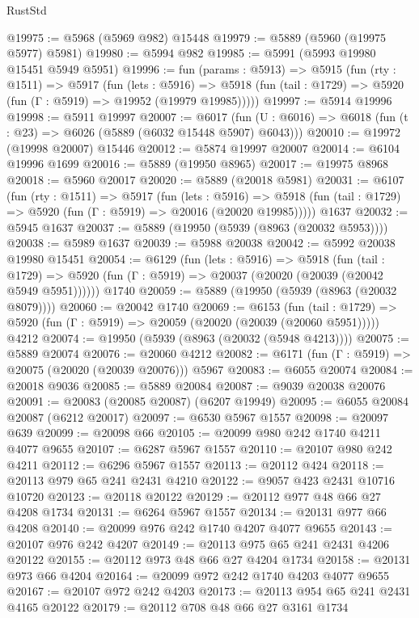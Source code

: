 \begin{lexlean}{RustStd}
\begin{coremodule}
@19975 := @5968 (@5969 @982) @15448
@19979 := @5889 (@5960 (@19975 @5977) @5981)
@19980 := @5994 @982
@19985 := @5991 (@5993 @19980 @15451 @5949 @5951)
@19996 := fun (params : @5913) =>
  @5915
    (fun (rty : @1511) =>
    @5917
      (fun (lets : @5916) =>
      @5918 (fun (tail : @1729) => @5920 (fun (Γ : @5919) => @19952 (@19979 @19985)))))
@19997 := @5914 @19996
@19998 := @5911 @19997
@20007 := @6017
    (fun (U : @6016) => @6018 (fun (t : @23) => @6026 (@5889 (@6032 @15448 @5907) @6043)))
@20010 := @19972 (@19998 @20007) @15446
@20012 := @5874 @19997 @20007
@20014 := @6104 @19996 @1699
@20016 := @5889 (@19950 @8965)
@20017 := @19975 @8968
@20018 := @5960 @20017
@20020 := @5889 (@20018 @5981)
@20031 := @6107
    (fun (rty : @1511) =>
    @5917
      (fun (lets : @5916) =>
      @5918 (fun (tail : @1729) => @5920 (fun (Γ : @5919) => @20016 (@20020 @19985)))))
    @1637
@20032 := @5945 @1637
@20037 := @5889 (@19950 (@5939 (@8963 (@20032 @5953))))
@20038 := @5989 @1637
@20039 := @5988 @20038
@20042 := @5992 @20038 @19980 @15451
@20054 := @6129
    (fun (lets : @5916) =>
    @5918
      (fun (tail : @1729) =>
      @5920 (fun (Γ : @5919) => @20037 (@20020 (@20039 (@20042 @5949 @5951))))))
    @1740
@20059 := @5889 (@19950 (@5939 (@8963 (@20032 @8079))))
@20060 := @20042 @1740
@20069 := @6153
    (fun (tail : @1729) => @5920 (fun (Γ : @5919) => @20059 (@20020 (@20039 (@20060 @5951)))))
    @4212
@20074 := @19950 (@5939 (@8963 (@20032 (@5948 @4213))))
@20075 := @5889 @20074
@20076 := @20060 @4212
@20082 := @6171 (fun (Γ : @5919) => @20075 (@20020 (@20039 @20076))) @5967
@20083 := @6055 @20074
@20084 := @20018 @9036
@20085 := @5889 @20084
@20087 := @9039 @20038 @20076
@20091 := @20083 (@20085 @20087) (@6207 @19949)
@20095 := @6055 @20084 @20087 (@6212 @20017)
@20097 := @6530 @5967 @1557
@20098 := @20097 @639
@20099 := @20098 @66
@20105 := @20099 @980 @242 @1740 @4211 @4077 @9655
@20107 := @6287 @5967 @1557
@20110 := @20107 @980 @242 @4211
@20112 := @6296 @5967 @1557
@20113 := @20112 @424
@20118 := @20113 @979 @65 @241 @2431 @4210
@20122 := @9057 @423 @2431 @10716 @10720
@20123 := @20118 @20122
@20129 := @20112 @977 @48 @66 @27 @4208 @1734
@20131 := @6264 @5967 @1557
@20134 := @20131 @977 @66 @4208
@20140 := @20099 @976 @242 @1740 @4207 @4077 @9655
@20143 := @20107 @976 @242 @4207
@20149 := @20113 @975 @65 @241 @2431 @4206 @20122
@20155 := @20112 @973 @48 @66 @27 @4204 @1734
@20158 := @20131 @973 @66 @4204
@20164 := @20099 @972 @242 @1740 @4203 @4077 @9655
@20167 := @20107 @972 @242 @4203
@20173 := @20113 @954 @65 @241 @2431 @4165 @20122
@20179 := @20112 @708 @48 @66 @27 @3161 @1734

\end{coremodule}
\end{lexlean}
